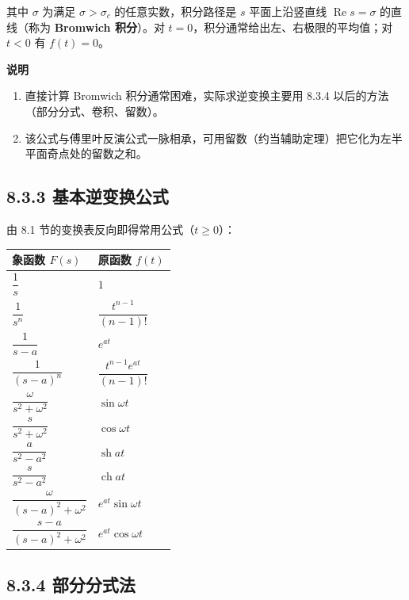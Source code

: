 其中 \(\sigma\) 为满足 \(\sigma>\sigma_c\) 的任意实数，积分路径是 \(s\)
平面上沿竖直线 \(\operatorname{Re}s=\sigma\) 的直线（称为
\textbf{Bromwich 积分}）。对 \(t=0\)，积分通常给出左、右极限的平均值；对
\(t<0\) 有 \(f(t)=0\)。

\textbf{说明}

\begin{enumerate}
\def\labelenumi{\arabic{enumi}.}
\tightlist
\item
  直接计算 Bromwich 积分通常困难，实际求逆变换主要用 8.3.4
  以后的方法（部分分式、卷积、留数）。
\item
  该公式与傅里叶反演公式一脉相承，可用留数（约当辅助定理）把它化为左半平面奇点处的留数之和。
\end{enumerate}

\subsection{8.3.3
基本逆变换公式}\label{ux57faux672cux9006ux53d8ux6362ux516cux5f0f}

由 8.1 节的变换表反向即得常用公式（\(t\ge 0\)）：

{\def\LTcaptype{none} %
\begin{longtable}[]{@{}ll@{}}
\toprule\noalign{}
象函数 \(F(s)\) & 原函数 \(f(t)\) \\
\midrule\noalign{}
\endhead
\bottomrule\noalign{}
\endlastfoot
\(\dfrac{1}{s}\) & \(1\) \\
\(\dfrac{1}{s^n}\) & \(\dfrac{t^{n-1}}{(n-1)!}\) \\
\(\dfrac{1}{s-a}\) & \(e^{at}\) \\
\(\dfrac{1}{(s-a)^n}\) & \(\dfrac{t^{n-1}e^{at}}{(n-1)!}\) \\
\(\dfrac{\omega}{s^2+\omega^2}\) & \(\sin\omega t\) \\
\(\dfrac{s}{s^2+\omega^2}\) & \(\cos\omega t\) \\
\(\dfrac{a}{s^2-a^2}\) & \(\operatorname{sh} at\) \\
\(\dfrac{s}{s^2-a^2}\) & \(\operatorname{ch} at\) \\
\(\dfrac{\omega}{(s-a)^2+\omega^2}\) & \(e^{at}\sin\omega t\) \\
\(\dfrac{s-a}{(s-a)^2+\omega^2}\) & \(e^{at}\cos\omega t\) \\
\end{longtable}
}

\subsection{8.3.4 部分分式法}\label{ux90e8ux5206ux5206ux5f0fux6cd5}

